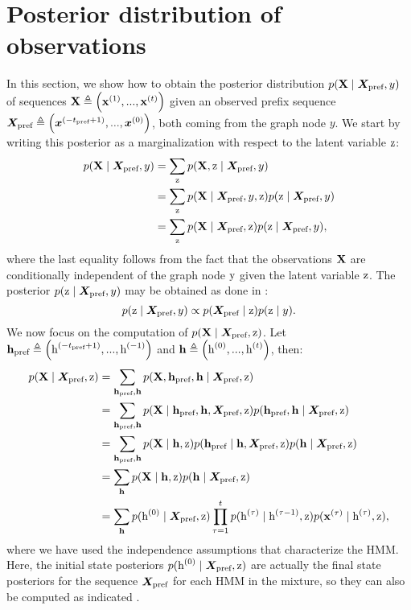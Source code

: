 \section{Posterior distribution of observations}
\label{sec:posterior_proof}
In this section, we show how to obtain the posterior distribution $p({\mathbf{X}} \mid {\bm{X}}_\text{pref}, y)$ of sequences ${\mathbf{X}} \triangleq \left({\mathbf{x}}^{(1)}, ...,{\mathbf{x}}^{(t)}\right)$ given an observed prefix sequence ${\bm{X}}_\text{pref} \triangleq \left({\bm{x}}^{(-t_\text{pref}+1)}, ...,{\bm{x}}^{(0)}\right)$, both coming from the graph node $y$. We start by writing this posterior as a marginalization with respect to the latent variable ${\textnormal{z}}$:
\begin{align}
\label{mhmm_posterior}
p({\mathbf{X}} \mid {\bm{X}}_\text{pref}, y) &= \sum_{{\textnormal{z}}} p({\mathbf{X}}, {\textnormal{z}} \mid {\bm{X}}_\text{pref}, y)\nonumber\\
&= \sum_{{\textnormal{z}}} p({\mathbf{X}} \mid {\bm{X}}_\text{pref}, y, {\textnormal{z}}) p({\textnormal{z}} \mid {\bm{X}}_\text{pref}, y) \nonumber\\
&= \sum_{{\textnormal{z}}} p({\mathbf{X}} \mid {\bm{X}}_\text{pref}, {\textnormal{z}}) p({\textnormal{z}} \mid {\bm{X}}_\text{pref}, y),
\end{align}
where the last equality follows from the fact that the observations ${\mathbf{X}}$ are conditionally independent of the graph node ${\textnormal{y}}$ given the latent variable ${\textnormal{z}}$. The posterior $p({\textnormal{z}} \mid {\bm{X}}_\text{pref}, y)$ may be obtained as done in :
\begin{equation}
p({\textnormal{z}} \mid {\bm{X}}_\text{pref}, y) \propto p({\bm{X}}_\text{pref} \mid {\textnormal{z}})p({\textnormal{z}} \mid y).
\end{equation}
We now focus on the computation of $p({\mathbf{X}} \mid {\bm{X}}_\text{pref}, {\textnormal{z}})$. Let ${\mathbf{h}}_\text{pref} \triangleq \left({\textnormal{h}}^{(-t_\text{pref}+1)}, ...,{\textnormal{h}}^{(-1)}\right)$ and ${\mathbf{h}} \triangleq \left({\textnormal{h}}^{(0)}, ...,{\textnormal{h}}^{(t)}\right)$, then:
\begin{align}
p({\mathbf{X}} \mid {\bm{X}}_\text{pref}, {\textnormal{z}}) &= \sum_{{\mathbf{h}}_\text{pref}, {\mathbf{h}}} p({\mathbf{X}}, {\mathbf{h}}_\text{pref}, {\mathbf{h}} \mid {\bm{X}}_\text{pref}, {\textnormal{z}}) \nonumber\\
&= \sum_{{\mathbf{h}}_\text{pref}, {\mathbf{h}}} p({\mathbf{X}} \mid {\mathbf{h}}_\text{pref}, {\mathbf{h}}, {\bm{X}}_\text{pref}, {\textnormal{z}}) p({\mathbf{h}}_\text{pref}, {\mathbf{h}} \mid {\bm{X}}_\text{pref}, {\textnormal{z}}) \nonumber\\
&= \sum_{{\mathbf{h}}_\text{pref}, {\mathbf{h}}} p({\mathbf{X}} \mid {\mathbf{h}}, {\textnormal{z}}) p({\mathbf{h}}_\text{pref} \mid {\mathbf{h}}, {\bm{X}}_\text{pref}, {\textnormal{z}}) p({\mathbf{h}} \mid {\bm{X}}_\text{pref}, {\textnormal{z}}) \nonumber\\
&= \sum_{{\mathbf{h}}} p({\mathbf{X}} \mid {\mathbf{h}}, {\textnormal{z}}) p({\mathbf{h}} \mid {\bm{X}}_\text{pref}, {\textnormal{z}}) \nonumber\\
&= \sum_{{\mathbf{h}}} p({\textnormal{h}}^{(0)} \mid {\bm{X}}_\text{pref}, {\textnormal{z}}) \prod_{\tau=1}^{t} p({\textnormal{h}}^{(\tau)} \mid {\textnormal{h}}^{(\tau-1)}, {\textnormal{z}}) p({\mathbf{x}}^{(\tau)} \mid {\textnormal{h}}^{(\tau)}, {\textnormal{z}}),
\end{align}
where we have used the independence assumptions that characterize the HMM. Here, the initial state posteriors $p({\textnormal{h}}^{(0)} \mid {\bm{X}}_\text{pref}, {\textnormal{z}})$ are actually the final state posteriors for the sequence ${\bm{X}}_\text{pref}$ for each HMM in the mixture, so they can also be computed as indicated .

